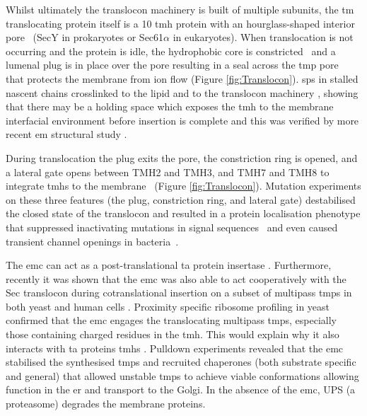 Whilst ultimately the translocon machinery is built of multiple subunits, the \gls{tm} translocating protein itself is a 10 \gls{tmh} protein with an hourglass\--shaped interior pore~\cite{Berg2004} (SecY in prokaryotes or Sec61$\alpha$ in eukaryotes).
When translocation is not occurring and the protein is idle, the hydrophobic core is constricted~\cite{Junne2010} and a lumenal plug is in place over the pore resulting in a seal across the \gls{tmp} pore~\cite{Tam2005, Junne2006} that protects the membrane from ion flow \cite{Park2011} (Figure \ref{fig:Translocon}).
\gls{sp}s in stalled nascent chains crosslinked to the lipid and to the translocon machinery \cite{Martoglio1995}, showing that there may be a holding space which exposes the \gls{tmh} to the membrane  interfacial environment before insertion is complete and this was verified by more recent \gls{em} structural study \cite{Gogala2014, Park2012}.

During translocation the plug exits the pore, the constriction ring is opened, and a lateral gate opens between TMH2 and TMH3, and TMH7 and TMH8 to integrate \gls{tmh}s to the membrane~\cite{Berg2004, Petriman2018, Hizlan2012, Bischoff2014, Gogala2014, Egea2010} (Figure \ref{fig:Translocon}).
Mutation experiments on these three features (the plug, constriction ring, and lateral gate) destabilised the closed state of the translocon and resulted in a protein localisation phenotype that suppressed inactivating mutations in signal sequences~\cite{Emr1981, Veenendaal2004, Li2007, Junne2007} and even caused transient channel openings in bacteria~\cite{Saparov2007}.

The \gls{emc} can act as a post\--translational \gls{ta} protein insertase \cite{Guna2018}.
Furthermore, recently it was shown that the \gls{emc} was also able to act cooperatively with the Sec translocon during cotranslational insertion on a subset of multipass \gls{tmp}s in both yeast and human cells \cite{Shurtleff2018}.
Proximity specific ribosome profiling in yeast confirmed that the \gls{emc} engages the translocating multipass \gls{tmp}s, especially those containing charged residues in the \gls{tmh}.
This would explain why it also interacts with \gls{ta} proteins \gls{tmh}s \cite{Guna2018, Shurtleff2018}.
Pulldown experiments revealed that the \gls{emc} stabilised the synthesised \gls{tmp}s and recruited chaperones (both substrate specific and general) that allowed unstable \gls{tmp}s to achieve viable conformations allowing function in the \gls{er} and transport to the Golgi.
In the absence of the \gls{emc}, UPS (a proteasome) degrades the membrane proteins.

